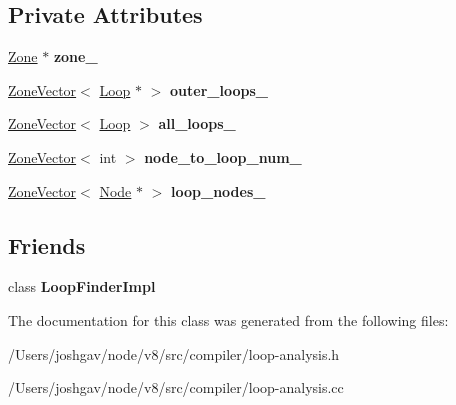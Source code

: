 \subsection*{Private Attributes}
\begin{DoxyCompactItemize}
\item 
\hyperlink{classv8_1_1internal_1_1_zone}{Zone} $\ast$ {\bfseries zone\+\_\+}\hypertarget{classv8_1_1internal_1_1compiler_1_1_loop_tree_a1e75864b1001ce8cc8e2f9069e701c02}{}\label{classv8_1_1internal_1_1compiler_1_1_loop_tree_a1e75864b1001ce8cc8e2f9069e701c02}

\item 
\hyperlink{classv8_1_1internal_1_1_zone_vector}{Zone\+Vector}$<$ \hyperlink{classv8_1_1internal_1_1compiler_1_1_loop_tree_1_1_loop}{Loop} $\ast$ $>$ {\bfseries outer\+\_\+loops\+\_\+}\hypertarget{classv8_1_1internal_1_1compiler_1_1_loop_tree_a1ad7a25eb9321a8bc49d4a0f8a5389ca}{}\label{classv8_1_1internal_1_1compiler_1_1_loop_tree_a1ad7a25eb9321a8bc49d4a0f8a5389ca}

\item 
\hyperlink{classv8_1_1internal_1_1_zone_vector}{Zone\+Vector}$<$ \hyperlink{classv8_1_1internal_1_1compiler_1_1_loop_tree_1_1_loop}{Loop} $>$ {\bfseries all\+\_\+loops\+\_\+}\hypertarget{classv8_1_1internal_1_1compiler_1_1_loop_tree_ac966271b3b91a0fffb4b1a89a1029d99}{}\label{classv8_1_1internal_1_1compiler_1_1_loop_tree_ac966271b3b91a0fffb4b1a89a1029d99}

\item 
\hyperlink{classv8_1_1internal_1_1_zone_vector}{Zone\+Vector}$<$ int $>$ {\bfseries node\+\_\+to\+\_\+loop\+\_\+num\+\_\+}\hypertarget{classv8_1_1internal_1_1compiler_1_1_loop_tree_a4a07e28b8269bb7e9f5f275100769a45}{}\label{classv8_1_1internal_1_1compiler_1_1_loop_tree_a4a07e28b8269bb7e9f5f275100769a45}

\item 
\hyperlink{classv8_1_1internal_1_1_zone_vector}{Zone\+Vector}$<$ \hyperlink{classv8_1_1internal_1_1compiler_1_1_node}{Node} $\ast$ $>$ {\bfseries loop\+\_\+nodes\+\_\+}\hypertarget{classv8_1_1internal_1_1compiler_1_1_loop_tree_a38b29e07790b1fc6f3391b5f43ea29cc}{}\label{classv8_1_1internal_1_1compiler_1_1_loop_tree_a38b29e07790b1fc6f3391b5f43ea29cc}

\end{DoxyCompactItemize}
\subsection*{Friends}
\begin{DoxyCompactItemize}
\item 
class {\bfseries Loop\+Finder\+Impl}\hypertarget{classv8_1_1internal_1_1compiler_1_1_loop_tree_a7c3aef85599c6822d83a965a321dfbc3}{}\label{classv8_1_1internal_1_1compiler_1_1_loop_tree_a7c3aef85599c6822d83a965a321dfbc3}

\end{DoxyCompactItemize}


The documentation for this class was generated from the following files\+:\begin{DoxyCompactItemize}
\item 
/\+Users/joshgav/node/v8/src/compiler/loop-\/analysis.\+h\item 
/\+Users/joshgav/node/v8/src/compiler/loop-\/analysis.\+cc\end{DoxyCompactItemize}
